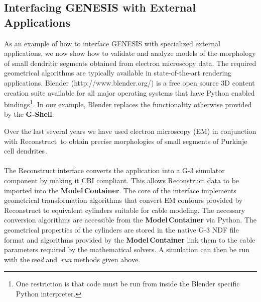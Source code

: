 \documentclass[10pt]{article}
\begin{document}
\subsection*{Interfacing GENESIS with External Applications}


As an example of how to interface GENESIS with specialized external
applications, we now show how to validate and analyze models of the
morphology of small dendritic segments obtained from electron
microscopy data.  The required geometrical algorithms are typically
available in state-of-the-art rendering applications.  Blender
(http://www.blender.org/) is a free open source 3D content creation
suite available for all major operating systems that have Python
enabled bindings\footnote{ One restriction is that code must be run
  from inside the Blender specific Python interpreter.}. In our
example, Blender replaces the functionality otherwise provided by the
{\bf G-Shell}.

Over the last several years we have used electron microscopy (EM) in conjunction
with Reconstruct\,\cite{jc05:_recon} to obtain precise
morphologies of small segments of Purkinje cell
dendrites\,\cite{huo09:_purkin, cornelis08:_model_neuros_genes}.\\

 \\

The Reconstruct interface converts the application
into a G-3 simulator component by making it CBI compliant. This allows
Reconstruct data to be imported into the {\bf Model\,Container}.
The core of the interface implements geometrical transformation
algorithms that convert EM contours provided by Reconstruct to
equivalent cylinders suitable for cable modeling. The necessary conversion algorithms are accessible from the
{\bf Model\,Container} via Python.
The geometrical properties of the cylinders are stored in the native
G-3 NDF file format and algorithms provided by the {\bf Model\,Container}
link them to the cable parameters required by the mathematical
solvers.  A simulation can then be run with the\,{\it read} and\,{\it
  run} methods given above.
\end{document}
